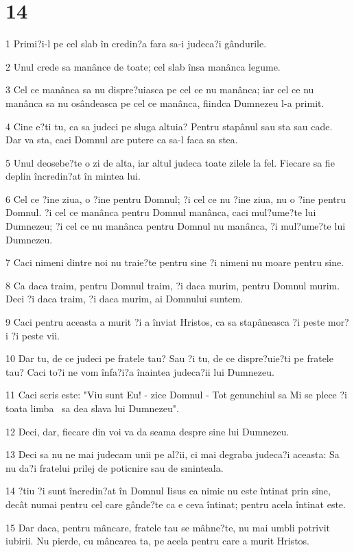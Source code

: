 \chapter{14}

\par 1 Primi?i-l pe cel slab în credin?a fara sa-i judeca?i gândurile.
\par 2 Unul crede sa manânce de toate; cel slab însa manânca legume.
\par 3 Cel ce manânca sa nu dispre?uiasca pe cel ce nu manânca; iar cel ce nu manânca sa nu osândeasca pe cel ce manânca, fiindca Dumnezeu l-a primit.
\par 4 Cine e?ti tu, ca sa judeci pe sluga altuia? Pentru stapânul sau sta sau cade. Dar va sta, caci Domnul are putere ca sa-l faca sa stea.
\par 5 Unul deosebe?te o zi de alta, iar altul judeca toate zilele la fel. Fiecare sa fie deplin încredin?at în mintea lui.
\par 6 Cel ce ?ine ziua, o ?ine pentru Domnul; ?i cel ce nu ?ine ziua, nu o ?ine pentru Domnul. ?i cel ce manânca pentru Domnul manânca, caci mul?ume?te lui Dumnezeu; ?i cel ce nu manânca pentru Domnul nu manânca, ?i mul?ume?te lui Dumnezeu.
\par 7 Caci nimeni dintre noi nu traie?te pentru sine ?i nimeni nu moare pentru sine.
\par 8 Ca daca traim, pentru Domnul traim, ?i daca murim, pentru Domnul murim. Deci ?i daca traim, ?i daca murim, ai Domnului suntem.
\par 9 Caci pentru aceasta a murit ?i a înviat Hristos, ca sa stapâneasca ?i peste mor?i ?i peste vii.
\par 10 Dar tu, de ce judeci pe fratele tau? Sau ?i tu, de ce dispre?uie?ti pe fratele tau? Caci to?i ne vom înfa?i?a înaintea judeca?ii lui Dumnezeu.
\par 11 Caci scris este: "Viu sunt Eu! - zice Domnul - Tot genunchiul sa Mi se plece ?i toata limba  sa dea slava lui Dumnezeu".
\par 12 Deci, dar, fiecare din voi va da seama despre sine lui Dumnezeu.
\par 13 Deci sa nu ne mai judecam unii pe al?ii, ci mai degraba judeca?i aceasta: Sa nu da?i fratelui prilej de poticnire sau de sminteala.
\par 14 ?tiu ?i sunt încredin?at în Domnul Iisus ca nimic nu este întinat prin sine, decât numai pentru cel care gânde?te ca e ceva întinat; pentru acela întinat este.
\par 15 Dar daca, pentru mâncare, fratele tau se mâhne?te, nu mai umbli potrivit iubirii. Nu pierde, cu mâncarea ta, pe acela pentru care a murit Hristos.
